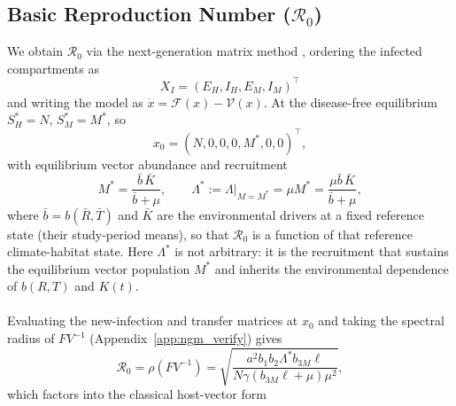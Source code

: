 \documentclass[a4paper,fleqn]{cas-dc}
\begin{document}
\subsection{Basic Reproduction Number ($\mathcal{R}_0$)}
\label{sec:basic_reproduction_number}

We obtain $\mathcal{R}_0$ via the next-generation matrix method
\cite{Rep_Number_Comp_Model}, ordering the infected compartments as
$$X_I=(E_H,I_H,E_M,I_M)^\top$$ and writing the model as
$\dot x=\mathcal{F}(x)-\mathcal{V}(x)$. At the disease-free equilibrium
$S_H^\ast=N$, $S_M^\ast=M^\ast$, so
\begin{equation}\label{eq:dfe}
x_0=(N,0,0,0,M^\ast,0,0)^\top,
\end{equation}
with equilibrium vector abundance and recruitment
\begin{equation}\label{eq:lambda_star}
M^\ast=\frac{\bar b\,\bar K}{\bar b+\mu},\qquad
\Lambda^\ast:=\Lambda\big|_{M=M^\ast}=\mu M^\ast=\frac{\mu\bar b\,\bar K}{\bar b+\mu},
\end{equation}
where $\bar b=b(\bar R,\bar T)$ and $\bar K$ are the environmental drivers at
a fixed reference state (their study-period means), so that $\mathcal{R}_0$
is a function of that reference climate-habitat state. Here $\Lambda^\ast$ is
not arbitrary: it is the recruitment that sustains the equilibrium vector
population $M^\ast$ and inherits the environmental dependence of $b(R,T)$ and
$K(t)$.
\\\\
Evaluating the new-infection and transfer matrices at $x_0$ and taking the
spectral radius of $FV^{-1}$ (Appendix~\ref{app:ngm_verify}) gives
\begin{equation}\label{eq:R0}
\mathcal{R}_0=\rho(FV^{-1})
=\sqrt{\frac{a^2b_1b_2\Lambda^\ast b_{3M}\ell}{N\gamma(b_{3M}\ell+\mu)\mu^2}},
\end{equation}
which factors into the classical host-vector form
\end{document}
